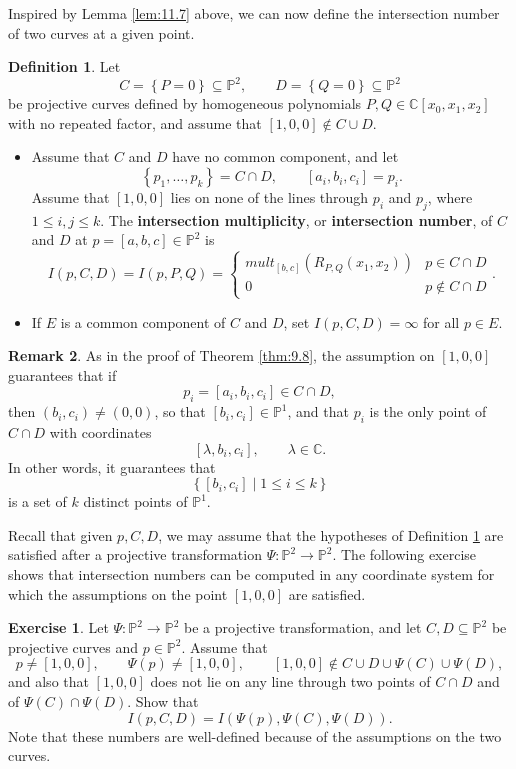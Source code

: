\documentclass{article}
\newcommand{\C}{\mathbb{C}}
\renewcommand{\P}{\mathbb{P}}
\newcommand{\rb}[1]{\left( #1 \right)}
\renewcommand{\sb}[1]{\left[ #1 \right]}
\newcommand{\cb}[1]{\left\{ #1 \right\}}
\theoremstyle{definition}\newtheorem{definition}{Definition}[section]
\theoremstyle{definition}\newtheorem{notation}[definition]{Notation}
\theoremstyle{definition}\newtheorem{remark}[definition]{Remark}
\theoremstyle{definition}\newtheorem{example1}[definition]{Example}
\theoremstyle{definition}\newtheorem{fact}{Fact}
\theoremstyle{definition}\newtheorem{exercise}{Exercise}
\theoremstyle{definition}\newtheorem*{example2}{Example}
\begin{document}
Inspired by Lemma \ref{lem:11.7} above, we can now define the intersection number of two curves at a given point.

\begin{definition}
\label{def:11.8}
Let
$$ C = \cb{P = 0} \subseteq \P^2, \qquad D = \cb{Q = 0} \subseteq \P^2 $$
be projective curves defined by homogeneous polynomials $ P, Q \in \C\sb{x_0, x_1, x_2} $ with no repeated factor, and assume that $ \sb{1, 0, 0} \notin C \cup D $.
\begin{itemize}
\item Assume that $ C $ and $ D $ have no common component, and let
$$ \cb{p_1, \dots, p_k} = C \cap D, \qquad \sb{a_i, b_i, c_i} = p_i. $$
Assume that $ \sb{1, 0, 0} $ lies on none of the lines through $ p_i $ and $ p_j $, where $ 1 \le i, j \le k $. The \textbf{intersection multiplicity}, or \textbf{intersection number}, of $ C $ and $ D $ at $ p = \sb{a, b, c} \in \P^2 $ is
$$ I\rb{p, C, D} = I\rb{p, P, Q} = \begin{cases}
mult_{\sb{b, c}}\rb{R_{P, Q}\rb{x_1, x_2}} & p \in C \cap D \\
0 & p \notin C \cap D
\end{cases}. $$
\item If $ E $ is a common component of $ C $ and $ D $, set $ I\rb{p, C, D} = \infty $ for all $ p \in E $.
\end{itemize}
\end{definition}

\begin{remark}
As in the proof of Theorem \ref{thm:9.8}, the assumption on $ \sb{1, 0, 0} $ guarantees that if
$$ p_i = \sb{a_i, b_i, c_i} \in C \cap D, $$
then $ \rb{b_i, c_i} \ne \rb{0, 0} $, so that $ \sb{b_i, c_i} \in \P^1 $, and that $ p_i $ is the only point of $ C \cap D $ with coordinates
$$ \sb{\lambda, b_i, c_i}, \qquad \lambda \in \C. $$
In other words, it guarantees that
$$ \cb{\sb{b_i, c_i} \mid 1 \le i \le k} $$
is a set of $ k $ distinct points of $ \P^1 $.
\end{remark}

Recall that given $ p, C, D $, we may assume that the hypotheses of Definition \ref{def:11.8} are satisfied after a projective transformation $ \Psi : \P^2 \to \P^2 $. The following exercise shows that intersection numbers can be computed in any coordinate system for which the assumptions on the point $ \sb{1, 0, 0} $ are satisfied.

\begin{exercise}
Let $ \Psi : \P^2 \to \P^2 $ be a projective transformation, and let $ C, D \subseteq \P^2 $ be projective curves and $ p \in \P^2 $. Assume that
$$ p \ne \sb{1, 0, 0}, \qquad \Psi\rb{p} \ne \sb{1, 0, 0}, \qquad \sb{1, 0, 0} \notin C \cup D \cup \Psi\rb{C} \cup \Psi\rb{D}, $$
and also that $ \sb{1, 0, 0} $ does not lie on any line through two points of $ C \cap D $ and of $ \Psi\rb{C} \cap \Psi\rb{D} $. Show that
$$ I\rb{p, C, D} = I\rb{\Psi\rb{p}, \Psi\rb{C}, \Psi\rb{D}}. $$
Note that these numbers are well-defined because of the assumptions on the two curves.
\end{exercise}
\end{document}
